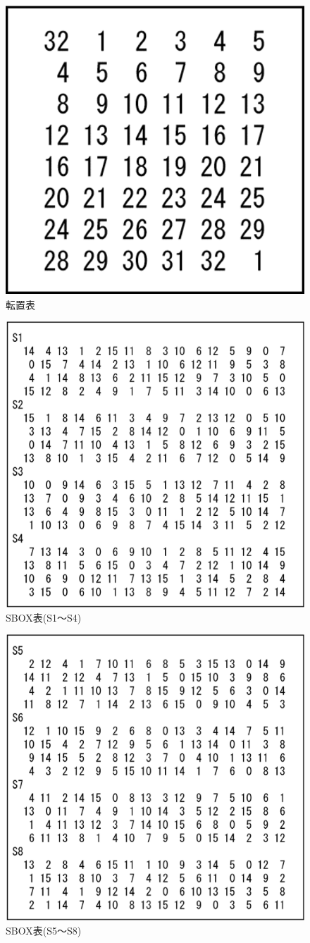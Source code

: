 \documentclass[uplatex]{jsarticle}
\begin{document}
\newpage

\begin{figure}[h]
  \begin{center}
    \includegraphics[width=0.5\linewidth]{kakue.eps}
    \caption{転置表}
    \label{figs3}
  \end{center}
\end{figure}

\begin{figure}[h]
  \begin{center}
    \includegraphics[width=0.5\linewidth]{sb1.eps}
    \caption{SBOX表(S1～S4)}
    \label{figs4}
  \end{center}
\end{figure}

\newpage

\begin{figure}[h]
  \begin{center}
    \includegraphics[width=0.5\linewidth]{sb2.eps}
    \caption{SBOX表(S5～S8)}
    \label{figs5}
  \end{center}
\end{figure}
\end{document}
